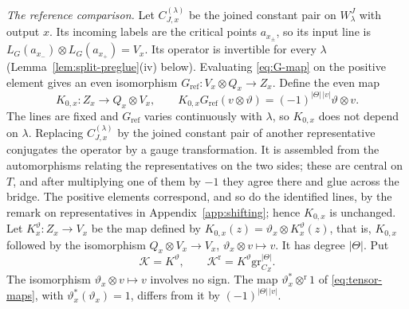 \documentclass[11pt]{amsart}
\theoremstyle{definition}
\theoremstyle{remark}
\theoremstyle{plain}
\numberwithin{equation}{section}
\newcommand{\eps}{\mathrm{gr}}
\begin{document}
\emph{The reference comparison.} Let $C^{(\lambda)}_{J,x}$ be the
joined constant pair on $W^J_\lambda$ with output $x$. Its incoming
labels are the critical points $a_{x_\pm}$, so its input line is
$L_G(a_{x_-})\otimes L_G(a_{x_+})=V_x$. Its operator is invertible for
every $\lambda$ (Lemma~\ref{lem:split-preglue}(iv) below). Evaluating \eqref{eq:G-map} on
the positive element gives an even isomorphism
$G_{\mathrm{ref}}:V_x\otimes Q_x\to Z_x$. Define the even map
\begin{equation}\label{eq:K0}
 K_{0,x}:Z_x\longrightarrow Q_x\otimes V_x,\qquad
 K_{0,x}G_{\mathrm{ref}}(v\otimes \vartheta)=(-1)^{|\Theta|\,|v|}\vartheta\otimes v .
\end{equation}
The lines are fixed and $G_{\mathrm{ref}}$ varies continuously with
$\lambda$, so $K_{0,x}$ does not depend on $\lambda$. Replacing
$C^{(\lambda)}_{J,x}$ by the joined constant pair of another representative
conjugates the operator by a gauge transformation. It is assembled from the
automorphisms relating the representatives on the two sides; these are
central on $T$, and after multiplying one of them by $-1$ they agree there
and glue across the bridge. The positive elements correspond, and so do the
identified lines, by the remark on representatives in
Appendix~\ref{app:shifting}; hence $K_{0,x}$ is unchanged. Let $K^\vartheta_x:Z_x\to V_x$ be
the map defined by $K_{0,x}(z)=\vartheta_x\otimes K^\vartheta_x(z)$, that is, $K_{0,x}$
followed by the isomorphism $Q_x\otimes V_x\to V_x$, $\vartheta_x\otimes v\mapsto v$.
It has degree $|\Theta|$. Put
\begin{equation}\label{eq:KR-def}
 \mathcal K=K^\vartheta,\qquad \mathcal K^{\mathrm r}=K^\vartheta\eps_{C_Z}^{|\Theta|} .
\end{equation}
The isomorphism $\vartheta_x\otimes v\mapsto v$ involves no sign. The map
$\vartheta_x^*\otimes^{\mathrm r}1$ of \eqref{eq:tensor-maps}, with $\vartheta_x^*(\vartheta_x)=1$, differs
from it by $(-1)^{|\Theta|\,|v|}$.
\end{document}
